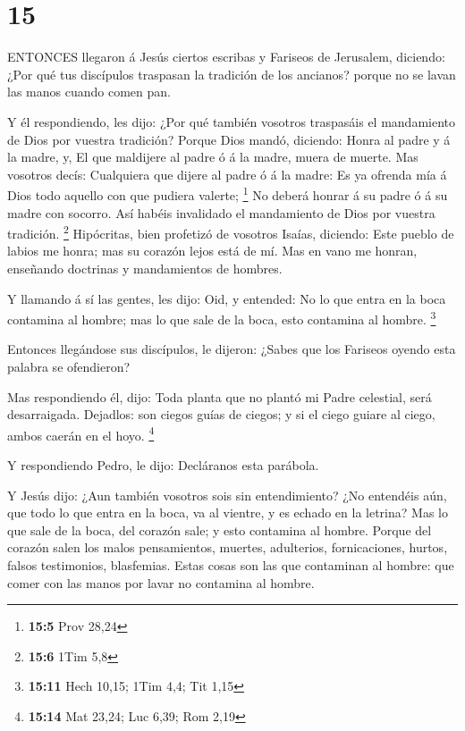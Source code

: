 \hypertarget{section-14}{%
\section{15}\label{section-14}}

 ENTONCES llegaron á Jesús ciertos escribas y Fariseos de
Jerusalem, diciendo:  ¿Por qué tus discípulos traspasan la
tradición de los ancianos? porque no se lavan las manos cuando comen
pan.

 Y él respondiendo, les dijo: ¿Por qué también vosotros
traspasáis el mandamiento de Dios por vuestra tradición? 
Porque Dios mandó, diciendo: Honra al padre y á la madre, y, El que
maldijere al padre ó á la madre, muera de muerte.  Mas
vosotros decís: Cualquiera que dijere al padre ó á la madre: Es ya
ofrenda mía á Dios todo aquello con que pudiera valerte; \footnote{\textbf{15:5}
  Prov 28,24}  No deberá honrar á su padre ó á su madre con
socorro. Así habéis invalidado el mandamiento de Dios por vuestra
tradición. \footnote{\textbf{15:6} 1Tim 5,8}  Hipócritas,
bien profetizó de vosotros Isaías, diciendo:  Este pueblo de
labios me honra; mas su corazón lejos está de mí.  Mas en
vano me honran, enseñando doctrinas y mandamientos de hombres.

 Y llamando á sí las gentes, les dijo: Oid, y entended:
 No lo que entra en la boca contamina al hombre; mas lo que
sale de la boca, esto contamina al hombre. \footnote{\textbf{15:11} Hech
  10,15; 1Tim 4,4; Tit 1,15}

 Entonces llegándose sus discípulos, le dijeron: ¿Sabes que
los Fariseos oyendo esta palabra se ofendieron?

 Mas respondiendo él, dijo: Toda planta que no plantó mi
Padre celestial, será desarraigada.  Dejadlos: son ciegos
guías de ciegos; y si el ciego guiare al ciego, ambos caerán en el hoyo.
\footnote{\textbf{15:14} Mat 23,24; Luc 6,39; Rom 2,19}

 Y respondiendo Pedro, le dijo: Decláranos esta parábola.

 Y Jesús dijo: ¿Aun también vosotros sois sin
entendimiento?  ¿No entendéis aún, que todo lo que entra en
la boca, va al vientre, y es echado en la letrina?  Mas lo
que sale de la boca, del corazón sale; y esto contamina al hombre.
 Porque del corazón salen los malos pensamientos, muertes,
adulterios, fornicaciones, hurtos, falsos testimonios, blasfemias.
 Estas cosas son las que contaminan al hombre: que comer
con las manos por lavar no contamina al hombre.

